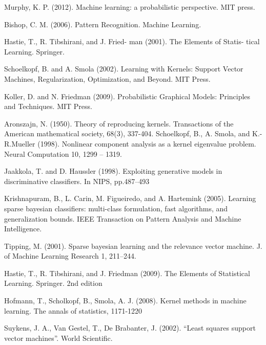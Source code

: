 

\begin{thebibliography}{A}

\bibitem [1]{}  Murphy, K. P. (2012). Machine learning: a probabilistic perspective. MIT press.

\bibitem [2]{} Bishop, C. M. (2006). Pattern Recognition. Machine Learning.

\bibitem [3]{} Hastie, T., R. Tibshirani, and J. Fried-
man (2001). The Elements of Statis-
tical Learning. Springer.

 Schoelkopf, B. and A. Smola (2002). Learning with Kernels: Support Vector Machines, Regularization, Optimization, and Beyond. MIT Press.

 Koller, D. and N. Friedman (2009). Probabilistic
Graphical Models: Principles and Techniques. MIT Press.

 Aronszajn, N. (1950). Theory of reproducing kernels. Transactions of the American mathematical society, 68(3), 337-404.
 Schoelkopf, B., A. Smola, and K.-R.Mueller (1998).
Nonlinear component analysis as a kernel eigenvalue problem. Neural
Computation 10, 1299 – 1319.

 Jaakkola, T. and D. Haussler (1998). Exploiting generative models in discriminative classifiers. In NIPS, pp.487–493

 Krishnapuram, B., L. Carin, M. Figueiredo, and A. Hartemink (2005). Learning sparse bayesian classifiers: multi-class formulation, fast algorithms, and generalization bounds. IEEE Transaction on Pattern Analysis and Machine Intelligence.

 Tipping, M. (2001). Sparse bayesian learning and the relevance vector machine. J. of Machine Learning Research 1, 211–244.

 Hastie, T., R. Tibshirani, and J. Friedman (2009). The Elements of Statistical Learning. Springer. 2nd edition

 Hofmann, T., Scholkopf, B., Smola, A. J. (2008). Kernel methods in machine learning. The annals of statistics, 1171-1220

 Suykens, J. A., Van Gestel, T., De Brabanter, J. (2002). “Least squares support vector machines”. World Scientific.


\end{thebibliography}
